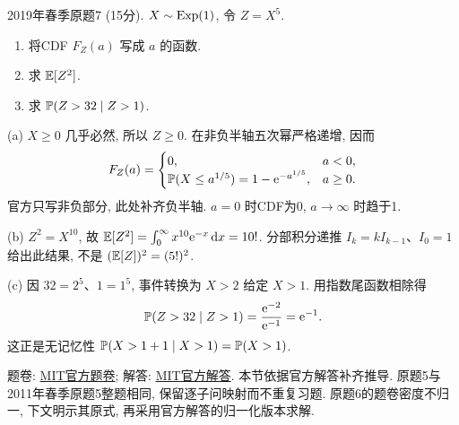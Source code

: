 \begin{exercise}\label{m2:2019s:q7}
2019年春季原题7 (15分). $X\sim\operatorname{Exp}(1)$, 令 $Z=X^5$.
\begin{enumerate}
\item[(a)]\label{m2:2019s:q7:a} 将CDF $F_Z(a)$ 写成 $a$ 的函数.
\item[(b)]\label{m2:2019s:q7:b} 求 $\mathbb E[Z^2]$.
\item[(c)]\label{m2:2019s:q7:c} 求 $\mathbb P(Z>32\mid Z>1)$.
\end{enumerate}
\end{exercise}
\begin{solution}
(a) $X\ge0$ 几乎必然, 所以 $Z\ge0$. 在非负半轴五次幂严格递增, 因而
\[
F_Z(a)=\begin{cases}0,&a<0,\\\mathbb P(X\le a^{1/5})=1-\mathrm e^{-a^{1/5}},&a\ge0.\end{cases}
\]
官方只写非负部分, 此处补齐负半轴. $a=0$ 时CDF为0, $a\to\infty$ 时趋于1.

(b) $Z^2=X^{10}$, 故 $\mathbb E[Z^2]=\int_0^\infty x^{10}\mathrm e^{-x}\,\mathrm d x=10!$. 分部积分递推 $I_k=kI_{k-1}$、$I_0=1$ 给出此结果, 不是 $(\mathbb E[Z])^2=(5!)^2$.

(c) 因 $32=2^5$、$1=1^5$, 事件转换为 $X>2$ 给定 $X>1$. 用指数尾函数相除得
\[
\mathbb P(Z>32\mid Z>1)=\frac{\mathrm e^{-2}}{\mathrm e^{-1}}=\mathrm e^{-1}.
\]
这正是无记忆性 $\mathbb P(X>1+1\mid X>1)=\mathbb P(X>1)$.
\end{solution}

题卷: \href{https://ocw.mit.edu/courses/18-600-probability-and-random-variables-fall-2019/resources/mit18_600f19_midterm2/}{MIT官方题卷}; 解答: \href{https://ocw.mit.edu/courses/18-600-probability-and-random-variables-fall-2019/resources/mit18_600f19_midterm2_soln/}{MIT官方解答}. 本节依据官方解答补齐推导. 原题5与2011年春季原题5整题相同, 保留逐子问映射而不重复习题. 原题6的题卷密度不归一, 下文明示其原式, 再采用官方解答的归一化版本求解.


